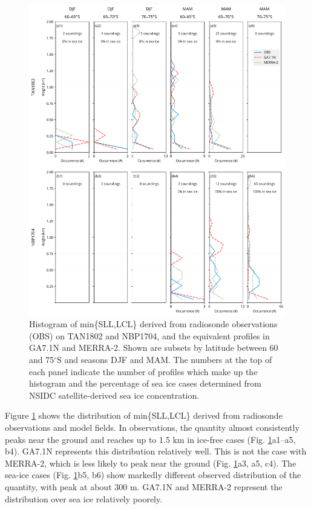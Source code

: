 \begin{figure}[p]
\centering
\includegraphics[width=\textwidth]{chapter2/fig/sst_lifting_level_panel_rev2.pdf}
\caption[Histogram of min\{SLL,LCL\}]{
Histogram of min\{SLL,LCL\} derived from radiosonde observations (OBS) on
TAN1802 and NBP1704, and the equivalent profiles in GA7.1N and MERRA-2.  Shown
are subsets by latitude between 60 and 75$^\circ$S and seasons DJF and MAM.
The numbers at the top of each panel indicate the number of profiles which make
up the histogram and the percentage of sea ice cases determined from NSIDC
satellite-derived sea ice concentration.
}
\label{fig:2:sll-distribution}
\end{figure}

Figure \ref{fig:2:sll-distribution} shows the distribution of min\{SLL,LCL\}
derived from radiosonde observations and model fields. In observations, the
quantity almost consistently peaks near the ground and reaches up to 1.5 km in
ice-free cases (Fig. \ref{fig:2:sll-distribution}a1--a5, b4). GA7.1N represents
this distribution relatively well. This is not the case with MERRA-2, which is
less likely to peak near the ground (Fig. \ref{fig:2:sll-distribution}a3, a5, c4).
The sea-ice cases (Fig. \ref{fig:2:sll-distribution}b5, b6)
show markedly different observed distribution of the quantity, with peak at
about 300 m.  GA7.1N and MERRA-2 represent the distribution over sea ice
relatively poorely.

